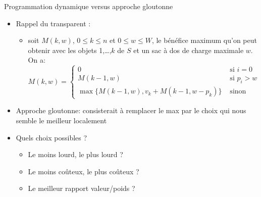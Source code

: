 \begin{frame}{Programmation dynamique versus approche gloutonne}
\begin{itemize}
\item Rappel du transparent \pageref{part6:knapsack}:
\begin{itemize}
\item soit $M(k,w)$, $0\leq k\leq n$ et $0\leq w\leq W$, le bénéfice
  maximum qu'on peut obtenir avec les objets 1,\ldots,$k$ de $S$ et un
  sac à dos de charge maximale $w$. On a:
  {\small \[M(k,w)=\left\{\begin{array}{ll} 0 & \mbox{ si
    }i=0\\ M(k-1,w) & \mbox{ si }
    p_i>w\\ \max\{M(k-1,w),v_k+M(k-1,w-p_k)\} & \mbox{ sinon}
\end{array}
\right.
\]}
\end{itemize}
\item Approche gloutonne: consisterait à remplacer le \alert{max} par le choix qui nous semble le meilleur localement
\item Quels choix possibles ?
\begin{itemize}
\item Le moins lourd, le plus lourd ?
\item Le moins coûteux, le plus coûteux ?
\item Le meilleur rapport valeur/poids ?
\end{itemize}
\end{itemize}

\end{frame}

